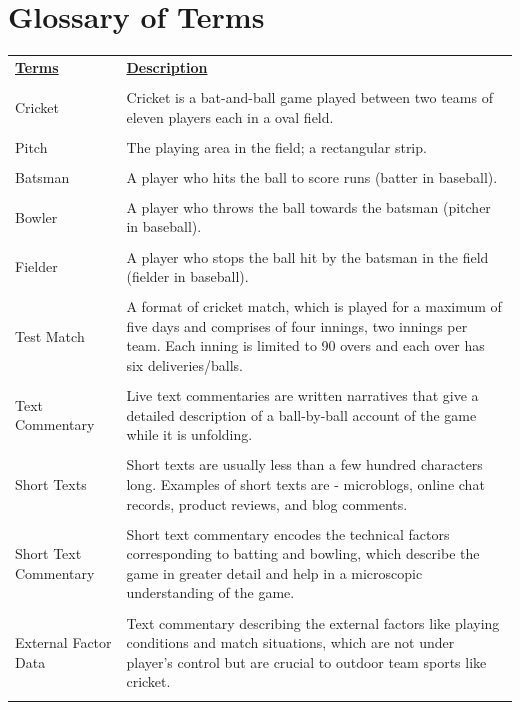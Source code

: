 \chapter*{Glossary of Terms}
\pagestyle{plain}

\begin{center}

\begin{tabular}{p{2in}p{4in}}
\textbf{\underline{Terms}}&\textbf{\underline{Description}} \\
& \\
Cricket & Cricket is a bat-and-ball game played between two teams of eleven players each in a oval field.\\
& \\ 
Pitch & The playing area in the field; a rectangular strip.\\
& \\
Batsman & A player who hits the ball to score runs (batter in baseball).\\
& \\
Bowler & A player who throws the ball towards the batsman (pitcher in baseball).\\
& \\
Fielder & A player who stops the ball hit by the batsman in the field (fielder in baseball).\\
& \\
Test Match & A format of cricket match, which is played for a maximum of five days and comprises of four innings, two innings per team. Each inning is limited to 90 overs and each over has six deliveries/balls.\\
& \\
%
Text Commentary & Live text commentaries are written narratives that give a detailed description of a ball-by-ball account of the game while it is unfolding.\\
& \\
Short Texts & Short texts are usually less than a few hundred characters long. Examples of short texts are - microblogs, online chat records, product reviews, and blog comments.\\
& \\
Short Text Commentary & Short text commentary encodes the technical factors corresponding to batting and bowling, which describe the game in greater detail and help in a microscopic understanding of the game.\\
& \\
External Factor Data & Text commentary describing the external factors like playing conditions and match situations, which are not under player's control but are crucial to outdoor team sports like cricket.\\
& \\
\end{tabular}

\end{center}
